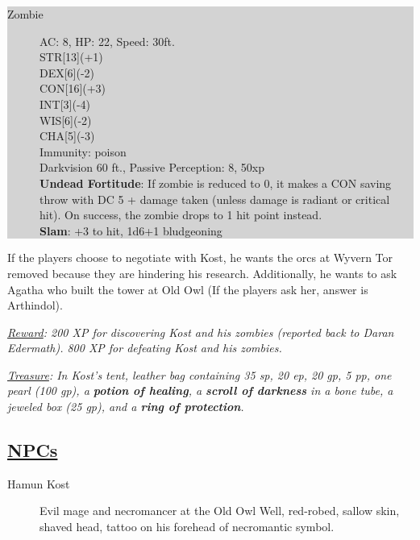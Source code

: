 \colorbox{lightgray}{\begin{minipage}{0.4\textwidth}
		\begin{description}
			\item[Zombie]
			AC: 8, HP: 22, Speed: 30ft.
			\\ STR[13](+1) 
			\\ DEX[6](-2)
			\\ CON[16](+3)
			\\ INT[3](-4)
			\\ WIS[6](-2)
			\\ CHA[5](-3) 
			\\ Immunity: poison
			\\ Darkvision 60 ft., Passive Perception: 8, 50xp
			\\ \textbf{Undead Fortitude}: If zombie is reduced to 0, it makes a CON saving throw with DC 5 + damage taken (unless damage is radiant or critical hit). On success, the zombie drops to 1 hit point instead.
			\\ \textbf{Slam}: +3 to hit, 1d6+1 bludgeoning
		\end{description}
\end{minipage}}
\break

If the players choose to negotiate with Kost, he wants the orcs at Wyvern Tor removed because they are hindering his research. Additionally, he wants to ask Agatha who built the tower at Old Owl (If the players ask her, answer is Arthindol).

\emph{\underline{Reward}: 200 XP for discovering Kost and his zombies (reported back to Daran Edermath). 800 XP for defeating Kost and his zombies.}

\emph{\underline{Treasure}: In Kost's tent, leather bag containing 35 sp, 20 ep, 20 gp, 5 pp, one pearl (100 gp), a \textbf{potion of healing}, a \textbf{scroll of darkness} in a bone tube, a jeweled box (25 gp), and a \textbf{ring of protection}.} 

\subsection{\underline{NPCs}}
\begin{description}
	\item[Hamun Kost] Evil mage and necromancer at the Old Owl Well, red-robed, sallow skin, shaved head, tattoo on his forehead of necromantic symbol.
\end{description}